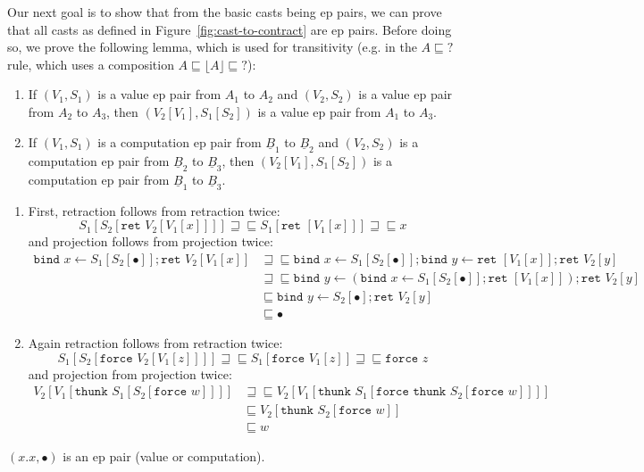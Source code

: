 \documentclass[acmsmall,screen,12pt]{acmart}
\renewcommand{\u}{\underline}
\newcommand{\floor}[1]{\lfloor#1\rfloor}
\newcommand{\ltdyn}{\sqsubseteq}
\newcommand{\gtdyn}{\sqsupseteq}
\newcommand{\equidyn}{\mathrel{\gtdyn\ltdyn}}
\newcommand{\dynv}{{?}}
\newcommand{\bindXtoYinZ}[2]{\kw{bind}#2 \leftarrow #1;}
\newcommand{\kw}[1]{\texttt{#1}\,\,}
\newcommand{\ret}{\kw{ret}}
\newcommand{\thunk}{\kw{thunk}}
\newcommand{\force}{\kw{force}}
\begin{document}
\begin{longonly}
Our next goal is to show that from the basic casts being ep pairs, we
can prove that all casts as defined in Figure~\ref{fig:cast-to-contract}
are ep pairs.  Before doing so, we prove the following lemma, which is
used for transitivity (e.g. in the $A \ltdyn \dynv$ rule, which uses a
composition $A \ltdyn \floor{A} \ltdyn \dynv$):
\begin{lemma}\hfill
  \label{lem:ep-pairs-compose}
  \begin{enumerate}
  \item If $(V_1, S_1)$ is a value ep pair from $A_1$ to $A_2$ and
    $(V_2,S_2)$ is a value ep pair from $A_2$ to $A_3$, then
    $(V_2[V_1], S_1[S_2])$ is a value ep pair from $A_1$ to $A_3$.
  \item If $(V_1, S_1)$ is a computation ep pair from $\u B_1$ to $\u B_2$ and
    $(V_2,S_2)$ is a computation ep pair from $\u B_2$ to $\u B_3$, then
    $(V_2[V_1], S_1[S_2])$ is a computation ep pair from $\u B_1$ to $\u B_3$.
  \end{enumerate}
\end{lemma}
\begin{longproof}
  \begin{enumerate}
  \item First, retraction follows from retraction twice:
    \[ S_1[S_2[\ret V_2[V_1[x]]]] \equidyn S_1[\ret [V_1[x]]] \equidyn x \]
    and projection follows from projection twice:
    \begin{align*}
      \bindXtoYinZ {S_1[S_2[\bullet]]} x \ret V_2[V_1[x]]
      &\equidyn
      {\bindXtoYinZ {S_1[S_2[\bullet]]} x \bindXtoYinZ {\ret [V_1[x]]} y \ret V_2[y]}\tag{$\u F\beta$}\\
      &\equidyn
      \bindXtoYinZ {(\bindXtoYinZ {S_1[S_2[\bullet]]} x {\ret [V_1[x]]})} y \ret V_2[y]\tag{Commuting conversion}\\
      &\ltdyn
      \bindXtoYinZ {S_2[\bullet]} y \ret V_2[y]\tag{Projection}\\
      &\ltdyn \bullet \tag{Projection}
    \end{align*}
  \item Again retraction follows from retraction twice:
    \[ S_1[S_2[\force V_2[V_1[z]]]] \equidyn S_1[\force V_1[z]] \equidyn \force z \]
    and projection from projection twice:
    \begin{align*}
      V_2[V_1[\thunk S_1[S_2[\force w]]]]
      &\equidyn V_2[V_1[\thunk S_1[\force \thunk S_2[\force w]]]]\tag{$U\beta$}\\
      &\ltdyn V_2[\thunk S_2[\force w]] \tag{Projection}\\
      &\ltdyn w \tag{Projection}
    \end{align*}
  \end{enumerate}
\end{longproof}
\begin{longonly}
\begin{lemma}
  \label{ep-pair-id}
  $(x. x, \bullet)$ is an ep pair (value or computation).
\end{lemma}  
\end{longonly}


\end{longonly}
\end{document}
